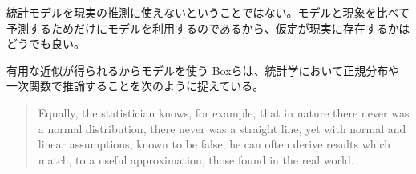 統計モデルを現実の推測に使えないということではない。モデルと現象を比べて予測するためだけにモデルを利用するのであるから、仮定が現実に存在するかはどうでも良い。



\begin{SMbox}{有用な近似が得られるからモデルを使う}
    Boxらは、統計学において正規分布や一次関数で推論することを次のように捉えている\cite{box1976science}。
\begin{quote}
    Equally, the statistician knows, for example, that in nature there never was a normal distribution, there never was a straight line, yet with normal and linear assumptions, known to be false, he can often derive results which match, to a useful approximation, those found in the real world. 
\end{quote}
\end{SMbox}



